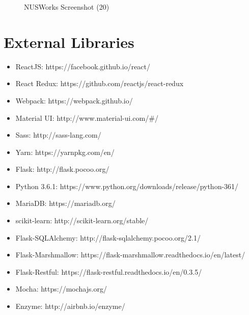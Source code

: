 \documentclass[fyp]{socreport}
\begin{document}
\begin{figure}
\caption{NUSWorks Screenshot (20)}
\label{screen-20}
\end{figure}

\chapter{External Libraries}
\begin{itemize}
	\item ReactJS: https://facebook.github.io/react/
	\item React Redux: https://github.com/reactjs/react-redux
	\item Webpack: https://webpack.github.io/
	\item Material UI: http://www.material-ui.com/\#/
	\item Sass: http://sass-lang.com/
	\item Yarn: https://yarnpkg.com/en/
	\item Flask: http://flask.pocoo.org/
	\item Python 3.6.1: https://www.python.org/downloads/release/python-361/
	\item MariaDB: https://mariadb.org/
	\item scikit-learn: http://scikit-learn.org/stable/
	\item Flask-SQLAlchemy: http://flask-sqlalchemy.pocoo.org/2.1/
	\item Flask-Marshmallow: https://flask-marshmallow.readthedocs.io/en/latest/
	\item Flask-Restful: https://flask-restful.readthedocs.io/en/0.3.5/
	\item Mocha: https://mochajs.org/
	\item Enzyme: http://airbnb.io/enzyme/
\end{itemize}
\end{document}
